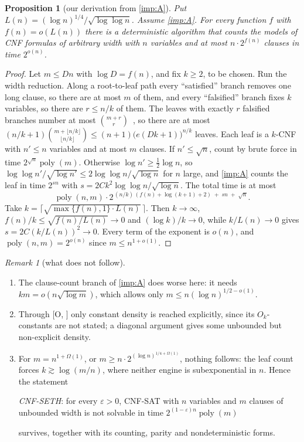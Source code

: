 \documentclass[10pt]{amsart}
\theoremstyle{plain}
\newtheorem{proposition}[theorem]{Proposition}
\theoremstyle{definition}
\theoremstyle{remark}
\newtheorem{remark}[theorem]{Remark}
\numberwithin{equation}{section}
\newcommand{\poly}{\operatorname{poly}}
\newcommand{\Oa}[1][]{\textup{[O\if\relax\detokenize{#1}\relax\else, #1\fi]}}
\begin{document}
\begin{proposition}[our derivation from \cref{imp:A}]\label{prop:frontier}
Put $L(n)=(\log n)^{1/4}/\sqrt{\log\log n}$. Assume \cref{imp:A}. For every function $f$ with
$f(n)=o(L(n))$ there is a deterministic algorithm that counts the models of CNF formulas of
arbitrary width with $n$ variables and at most $n\cdot2^{f(n)}$ clauses in time $2^{o(n)}$.
\end{proposition}

\begin{proof}
Let $m\le Dn$ with $\log D=f(n)$, and fix $k\ge2$, to be chosen. Run the width reduction. Along a
root-to-leaf path every ``satisfied'' branch removes one long clause, so there are at most $m$ of
them, and every ``falsified'' branch fixes $k$ variables, so there are $r\le n/k$ of them. The
leaves with exactly $r$ falsified branches number at most $\binom{m+r}{r}$~\cite[proof of
Lemma~5]{CIP06}, so there are at most
$(n/k+1)\binom{m+\lfloor n/k\rfloor}{\lfloor n/k\rfloor}\le(n+1)\bigl(e(Dk+1)\bigr)^{n/k}$ leaves.
Each leaf is a $k$-CNF with $n'\le n$ variables and at most $m$ clauses. If $n'\le\sqrt n$, count
by brute force in time $2^{\sqrt n}\poly(m)$. Otherwise $\log n'\ge\frac12\log n$, so
$\log\log n'/\sqrt{\log n'}\le2\log\log n/\sqrt{\log n}$ for $n$ large, and \cref{imp:A} counts
the leaf in time $2^{s n}$ with $s=2Ck^2\log\log n/\sqrt{\log n}$. The total time is at most
\[
  \poly(n,m)\cdot2^{\,(n/k)\,(f(n)+\log(k+1)+2)\;+\;sn\;+\;\sqrt n}.
\]
Take $k=\lceil\sqrt{\max\{f(n),1\}\cdot L(n)}\,\rceil$. Then $k\to\infty$, $f(n)/k\le\sqrt{f(n)/L(n)}\to0$
and $(\log k)/k\to0$, while $k/L(n)\to0$ gives $s=2C(k/L(n))^2\to0$. Every term of the exponent
is $o(n)$, and $\poly(n,m)=2^{o(n)}$ since $m\le n^{1+o(1)}$.
\end{proof}

\begin{remark}[what does not follow]\label{rem:frontier}
\leavevmode
\begin{enumerate}[label=\textup{(\alph*)}]
\item The clause-count branch of \cref{imp:A} does worse here: it needs $km=o(n\sqrt{\log m})$,
which allows only $m\le n(\log n)^{1/2-o(1)}$.
\item Through \Oa{} only constant density is reached explicitly, since its $O_k$-constants are not
stated; a diagonal argument gives some unbounded but non-explicit density.
\item For $m=n^{1+\Omega(1)}$, or $m\ge n\cdot2^{(\log n)^{1/4+\Omega(1)}}$, nothing follows: the
leaf count forces $k\gtrsim\log(m/n)$, where neither engine is subexponential in $n$. Hence the
statement
\begin{center}
\emph{CNF-SETH}: for every $\varepsilon>0$, CNF-SAT with $n$ variables and $m$ clauses of
unbounded width is not solvable in time $2^{(1-\varepsilon)n}\poly(m)$
\end{center}
survives, together with its counting, parity and nondeterministic forms.
\end{enumerate}
\end{remark}
\end{document}
